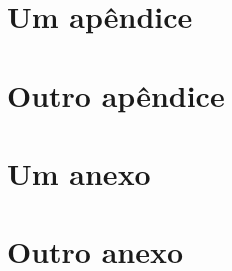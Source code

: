 \documentclass[phd,oneside]{ppgccufmg}  %
\begin{document}
\begin{appendices}

\chapter{Um apêndice}

\dummytxta
\dummytxtb
\dummytxtc
\dummytxta
\dummytxtb

\chapter{Outro apêndice}

\dummytxta
\dummytxtb
\dummytxtc
\dummytxta
\dummytxtb

\end{appendices}


\begin{attachments}

\chapter{Um anexo}

\dummytxta
\dummytxtb
\dummytxtc
\dummytxta
\dummytxtb

\chapter{Outro anexo}

\dummytxta
\dummytxtb

\end{attachments}
\end{document}
